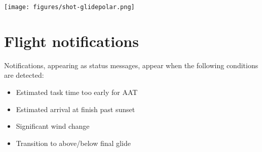 \begin{center}
\texttt{[image: figures/shot-glidepolar.png]}
\end{center}


\section{Flight notifications}

 Notifications, appearing as status messages, appear when the
 following conditions are detected: 
\begin{itemize}
\item Estimated task time too early for
 AAT 
\item Estimated arrival at finish past sunset
\item Significant wind change
\item Transition to above/below final glide
\end{itemize}
